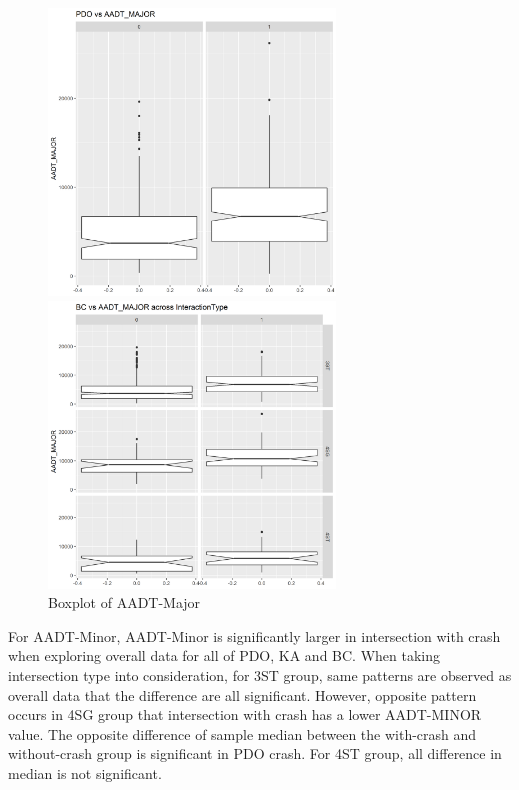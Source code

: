 \documentclass[11pt]{scrartcl} %
\begin{document}
\begin{figure}[H]
\begin{minipage}[t]{0.5\linewidth}
\centering
\includegraphics[width=3in]{image/major_all_pdo.png}
\small
\end{minipage}
\begin{minipage}[t]{0.5\linewidth}
\centering
\includegraphics[width=3in]{image/major_bc.png}
\small
\end{minipage}
\caption{Boxplot of AADT-Major}
\end{figure}

For AADT-Minor, AADT-Minor is significantly larger in intersection with crash when exploring overall data for all of PDO, KA and BC. When taking intersection type into consideration, for 3ST group, same patterns are observed as overall data that the difference are all significant. However, opposite pattern occurs in 4SG group that intersection with crash has a lower AADT-MINOR value. The opposite difference of sample median between the with-crash and without-crash group is significant in PDO crash. For 4ST group, all difference in median is not significant.
\end{document}
